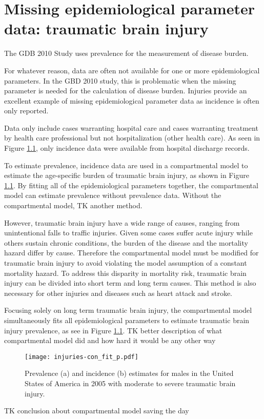 \chapter{Missing epidemiological parameter data: traumatic brain injury}
\label{applications-double_dismod}

The GDB 2010 Study uses prevalence for the measurement of disease burden.

For whatever reason, data are often not available for one or more
epidemiological parameters.  In the GBD 2010 study, this is
problematic when the missing parameter is needed for the calculation
of disease burden.  Injuries provide an excellent example of missing
epidemiological parameter data as incidence is often only reported.

Data only include cases warranting hospital care and cases warranting
treatment by health care professional but not hospitalization (other
health care).  As seen in Figure \ref{fig:app-injury brain fit},
only incidence data were available from hospital discharge records.

To estimate prevalence, incidence data are used in a compartmental model to estimate the
age-specific burden of traumatic brain injury, as shown in Figure
\ref{fig:app-injury brain fit}.  By fitting all of the epidemiological
parameters together, the compartmental model can estimate prevalence
without prevalence data.  Without the compartmental model, TK another method.

However, traumatic brain injury have a wide range of
causes, ranging from unintentional falls to traffic injuries.  
Given some cases suffer acute injury while others sustain
chronic conditions, the burden of the disease and the mortality hazard
differ by cause.  Therefore the compartmental model must be modified 
for traumatic brain injury to avoid violating the model assumption of a
constant mortality hazard.  To address this disparity in mortality
risk, traumatic brain injury can be divided into short term and long term
causes.  This method is also necessary for other injuries and
diseases such as heart attack and stroke.

Focusing solely on long term traumatic brain injury, the compartmental model simultaneously fits all epidemiological parameters to estimate traumatic brain injury
prevalence, as see in Figure \ref{fig:app-injury brain fit}.  TK better 
description of what compartmental model did and how hard it would be any other way

    \begin{figure}[h]
        \begin{center}
            \texttt{[image: injuries-con\_fit\_p.pdf]}
            \caption{Prevalence (a) and incidence (b)
              estimates for males in the United States of America in
              2005 with moderate to severe traumatic brain injury.}
            \label{fig:app-injury brain fit}
        \end{center}
    \end{figure}

TK conclusion about compartmental model saving the day

